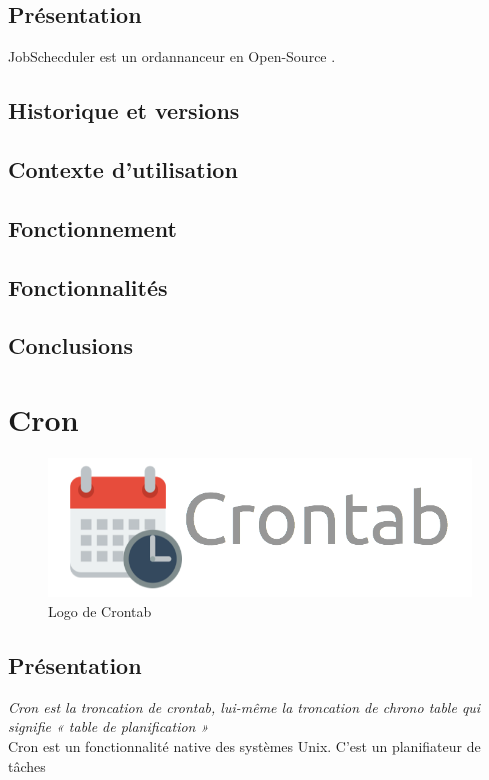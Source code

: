 \documentclass[12pt]{article}
\begin{document}
\subsection{Présentation}
JobSchecduler est un ordannanceur en Open-Source .
\subsection{Historique et versions}
\subsection{Contexte d'utilisation}
\subsection{Fonctionnement}
\subsection{Fonctionnalités}
\subsection{Conclusions}

\section{Cron}

\begin{figure}[ht]
    \includegraphics[scale=0.5]{images/crontab.png}
    \caption{Logo de Crontab}
\end{figure}

\subsection{Présentation}

\textit{Cron est la troncation de crontab, lui-même la troncation de chrono table qui signifie « table de planification »}
\\
Cron est un fonctionnalité native des systèmes Unix. C'est un planifiateur de tâches
\end{document}
